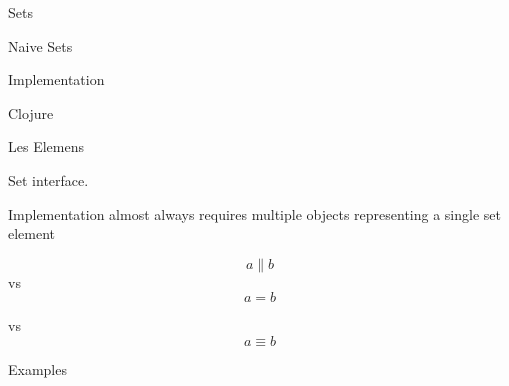 \begin{plSection}{Sets}
\begin{plSection}{Naive Sets}
\begin{plSection}{Implementation}
\begin{plSection}{Clojure}
\end{plSection}%
\begin{plSection}{Les Elemens}

Set interface.

Implementation almost always requires multiple objects
representing a single set element

\begin{equation}
a \parallel b
\end{equation}
vs
\begin{equation}
a = b
\end{equation}

vs
\begin{equation}
a \equiv b
\end{equation}

%   
%   
% 
% 
% 
% 
% 
% 
\end{plSection}%
\end{plSection}%
\begin{plSection}{Examples}
 

\end{plSection}
\end{plSection}
\end{plSection}
